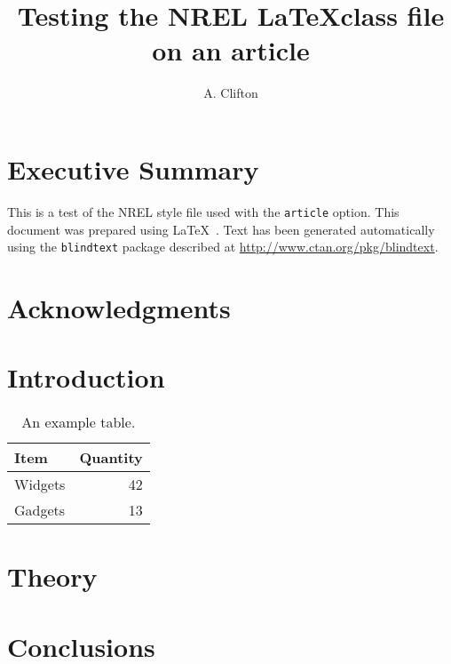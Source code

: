 \documentclass[10pt,letterpaper]{article}
\title{Testing the NREL \LaTeX class file on an article}
\author{A. Clifton}
\begin{document}
\maketitle
\frontmatter

\section*{Executive Summary}
This is a test of the NREL style file used with the \verb+article+ option. This document was prepared using \LaTeX\ \citep{Knuth_1984_a}. Text has been generated automatically using the \verb+blindtext+ package described at \url{http://www.ctan.org/pkg/blindtext}.

\section*{Acknowledgments}
\blindtext[1]

\cleardoublepage
\renewcommand{\contentsname}{Table of Contents}
\tableofcontents
\clearpage
\listoffigures
\listoftables
\mainmatter

\section{Introduction}
\blindtext[5]
\begin{table}[!h]
\centering
\caption{\label{tab:widgets}An example table.}
\begin{tabular}{lr}
Item & Quantity \\\hline
Widgets & 42 \\
Gadgets & 13
\end{tabular}
\end{table}

\section{Theory}
\blindmathpaper
\section{Conclusions}
\blindtext[3]

\cleardoublepage

\label{sec:Bib}

\end{document}
